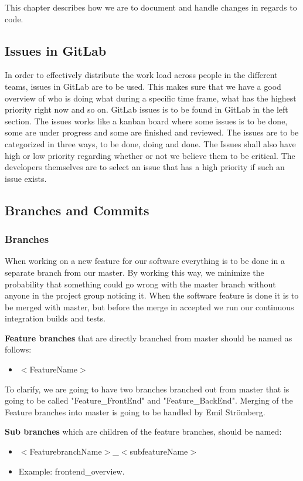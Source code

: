 This chapter describes how we are to document and handle changes in regards to code. 

\subsection{Issues in GitLab}
In order to effectively distribute the work load across people in the different teams, issues in GitLab are to be used. This makes sure that we have a good overview of who is doing what during a specific time frame, what has the highest priority right now and so on. GitLab issues is to be found in GitLab in the left section. The issues works like a kanban board where some issues is to be done, some are under progress and some are finished and reviewed. The issues are to be categorized in three ways, to be done, doing and done. The Issues shall also have high or low priority regarding whether or not we believe them to be critical. The developers themselves are to select an issue that has a high priority if such an issue exists. 


\subsection{Branches and Commits}

\subsubsection{Branches}
When working on a new feature for our software everything is to be done in a separate branch from our master. By working this way, we minimize the probability that something could go wrong with the master branch without anyone in the project group noticing it. When the software feature is done it is to be merged with master, but before the merge in accepted we run our continuous integration builds and tests. 

\textbf{Feature branches} that are directly branched from master should be named as follows: 
\begin{itemize}
    \item $<$FeatureName$>$
\end{itemize}
To clarify, we are going to have two branches branched out from master that is going to be called "Feature\_FrontEnd" and "Feature\_BackEnd". Merging of the Feature branches into master is going to be handled by Emil Strömberg. 


\textbf{Sub branches} which are children of the feature branches, should be named: 
\begin{itemize}
    \item $<$FeaturebranchName$>$\_$<$subfeatureName$>$
    \item Example: frontend\_overview.

\end{itemize}

